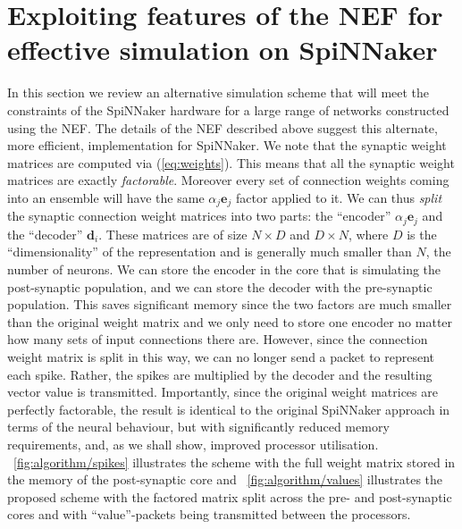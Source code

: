 \documentclass[conference]{IEEEtran}
\renewcommand{\vec}{\mathbf}  %
\begin{document}
  \section{Exploiting features of the NEF for effective simulation on SpiNNaker}
  \label{sec:exploiting}
  In this section we review an alternative simulation scheme that will meet the constraints of the SpiNNaker hardware for a large range of networks constructed using the NEF.
  The details of the NEF described above suggest this alternate, more efficient, implementation for SpiNNaker.
  We note that the synaptic weight matrices are computed via (\ref{eq:weights}).
  This means that all the synaptic weight matrices are exactly \textit{factorable}.
  Moreover every set of connection weights coming into an ensemble will have the same $\alpha_j \vec{e}_j$ factor applied to it.
  We can thus \textit{split} the synaptic connection weight matrices into two parts: the ``encoder'' $\alpha_j \vec{e}_j$ and the ``decoder'' $\vec{d}_i$.
  These matrices are of size $N \times D$ and $D \times N$, where $D$ is the ``dimensionality'' of the representation and is generally much smaller than $N$, the number of neurons.
  We can store the encoder in the core that is simulating the post-synaptic population, and we can store the decoder with the pre-synaptic population.
  This saves significant memory since the two factors are much smaller than the original weight matrix and we only need to store one encoder no matter how many sets of input connections there are.
  However, since the connection weight matrix is split in this way, we can no longer send a packet to represent each spike.
  Rather, the spikes are multiplied by the decoder and the resulting vector value is transmitted.
  Importantly, since the original weight matrices are perfectly factorable, the result is identical to the original SpiNNaker approach in terms of the neural behaviour, but with significantly reduced memory requirements, and, as we shall show, improved processor utilisation.
  \figurename~\ref{fig:algorithm/spikes} illustrates the scheme with the full weight matrix stored in the memory of the post-synaptic core and \figurename~\ref{fig:algorithm/values} illustrates the proposed scheme with the factored matrix split across the pre- and post-synaptic cores and with ``value''-packets being transmitted between the processors.
\end{document}
